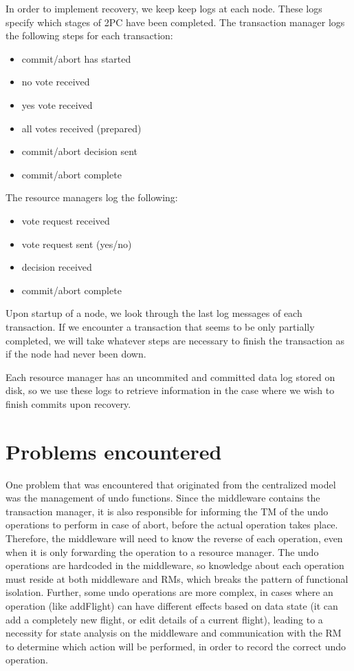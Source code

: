 \documentclass[11pt]{article}
\begin{document}
In order to implement recovery, we keep keep logs at each node. These logs specify which stages of 2PC have been completed. The transaction manager logs the following steps for each transaction:
\begin{itemize}
\item commit/abort has started
\item no vote received
\item yes vote received
\item all votes received (prepared)
\item commit/abort decision sent
\item commit/abort complete
\end{itemize}
The resource managers log the following:
\begin{itemize}
\item vote request received
\item vote request sent (yes/no)
\item decision received
\item commit/abort complete
\end{itemize} 
Upon startup of a node, we look through the last log messages of each transaction. If we encounter a transaction that seems to be only partially completed, we will take whatever steps are necessary to finish the transaction as if the node had never been down.\par 

Each resource manager has an uncommited and committed data log stored on disk, so we use these logs to retrieve information in the case where we wish to finish commits upon recovery.\par

\section*{Problems encountered}

One problem that was encountered that originated from the centralized model was the management of undo functions. Since the middleware contains the transaction manager, it is also responsible for informing the TM of the undo operations to perform in case of abort, before the actual operation takes place. Therefore, the middleware will need to know the reverse of each operation, even when it is only forwarding the operation to a resource manager. The undo operations are hardcoded in the middleware, so knowledge about each operation must reside at both middleware and RMs, which breaks the pattern of functional isolation. Further, some undo operations are more complex, in cases where an operation (like addFlight) can have different effects based on data state (it can add a completely new flight, or edit details of a current flight), leading to a necessity for state analysis on the middleware and communication with the RM to determine which action will be performed, in order to record the correct undo operation. \par
\end{document}
